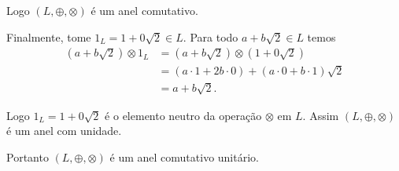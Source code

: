 \documentclass[12pt]{exam}
\begin{document}
    Logo $(L, \oplus, \otimes)$ é um anel comutativo.

    Finalmente, tome $1_L = 1 + 0\sqrt{2} \in L$. Para todo $a + b\sqrt{2} \in L$ temos
    \begin{align*}
        (a + b\sqrt{2}) \otimes 1_L &= (a + b\sqrt{2}) \otimes (1 + 0\sqrt{2}) \\ &= (a\cdot 1 + 2b\cdot 0) + (a\cdot 0 + b\cdot 1)\sqrt{2} \\ &= a + b\sqrt{2}.
    \end{align*}

    Logo $1_L = 1 + 0\sqrt{2}$ é o elemento neutro da operação $\otimes$ em $L$. Assim $(L, \oplus, \otimes)$ é um anel com unidade.

    Portanto $(L, \oplus, \otimes)$ é um anel comutativo unitário.
\end{document}
